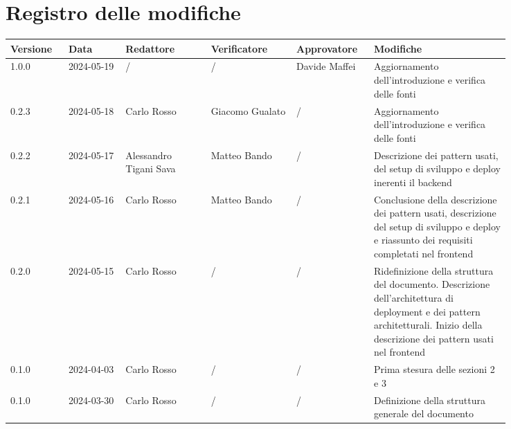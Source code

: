 \section*{Registro delle modifiche}
 {
  \renewcommand{\arraystretch}{1.5}
  \scriptsize
  \begin{longtable}{p{0.10\linewidth}p{0.10\linewidth}p{0.15\linewidth}p{0.15\linewidth}p{0.10\linewidth}p{0.24\linewidth}}
	  \textbf{Versione} & \textbf{Data} & \textbf{Redattore} 		& \textbf{Verificatore} & \textbf{Approvatore} 	& \textbf{Modifiche}                                 \\
	  \toprule
	  1.0.0             & 2024-05-19    & /  & / & Davide Maffei & Aggiornamento dell'introduzione e verifica delle fonti \\
	  \hline 
	  0.2.3             & 2024-05-18    & Carlo Rosso	& Giacomo Gualato & / & Aggiornamento dell'introduzione e verifica delle fonti \\
	  \hline 
	  0.2.2             & 2024-05-17    & Alessandro Tigani Sava	& Matteo Bando 			& /						& Descrizione dei pattern usati,
	  del setup di sviluppo e deploy inerenti il backend \\
	  \hline 
	  0.2.1             & 2024-05-16    & Carlo Rosso				& Matteo Bando 			& /						& Conclusione della descrizione dei pattern usati,
	  descrizione del setup di sviluppo e deploy e riassunto dei requisiti completati nel frontend \\
	  \hline
	  0.2.0             & 2024-05-15    & Carlo Rosso                                      & /
	                    & /             & Ridefinizione della struttura del documento.
	  Descrizione dell'architettura di deployment e dei pattern architetturali.
	  Inizio della descrizione dei pattern usati nel frontend                                                                                                                                  \\
	  \hline
	  0.1.0             & 2024-04-03    & Carlo Rosso                                      & /                     & /                    & Prima stesura delle sezioni 2 e 3                  \\
	  \hline
	  0.1.0             & 2024-03-30    & Carlo Rosso                                      & /                     & /                    & Definizione della struttura generale del documento \\
	  \bottomrule
  \end{longtable}
 }
